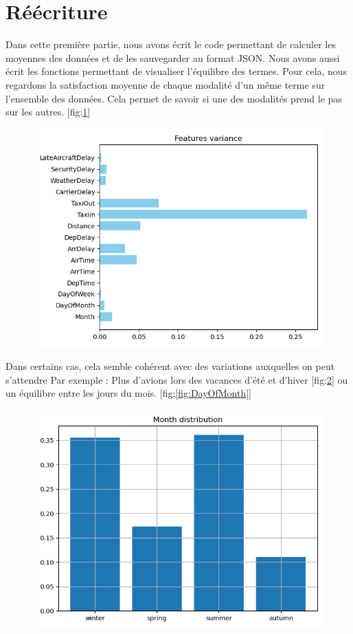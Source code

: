 \section{Réécriture}
  Dans cette première partie, nous avons écrit le code permettant de calculer les moyennes des données et de les sauvegarder au format JSON.
  Nous avons aussi écrit les fonctions permettant de visualiser l'équilibre des termes.
  Pour cela, nous regardons la satisfaction moyenne de chaque modalité d'un même terme sur l'ensemble des données.
  Cela permet de savoir si une des modalités prend le pas sur les autres. [fig:\ref{fig:balance}]

\begin{figure}[H]
  \centering
  \includegraphics[scale=1]{images/balance_figure.png}
  \caption{}
  \label{fig:balance}
\end{figure}

Dans certains cas, cela semble cohérent avec des variations auxquelles on peut s'attendre Par exemple : Plus d'avions lors des vacances d'été et d'hiver [fig:\ref{fig:Month}] ou un équilibre entre les jours du mois. [fig:\ref{fig:DayOfMonth}]

\begin{figure}[H]
  \centering
  \includegraphics[scale=1]{images/Month_distribution.png}
  \caption{}
  \label{fig:Month}
\end{figure}

